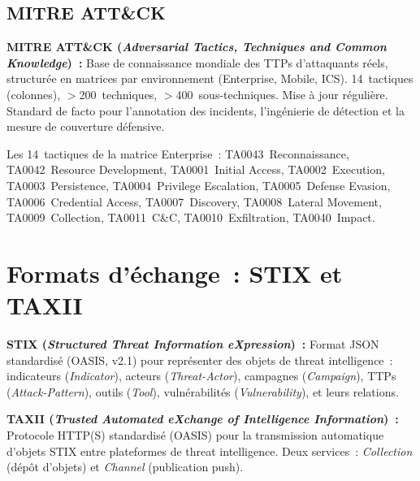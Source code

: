 \subsection{MITRE ATT\&CK}

\begin{boxdef}
\textbf{MITRE ATT\&CK (\textit{Adversarial Tactics, Techniques and Common
Knowledge})~:} Base de connaissance mondiale des TTPs d'attaquants réels,
structurée en matrices par environnement (Enterprise, Mobile, ICS).
14~tactiques (colonnes), $>$200~techniques, $>$400~sous-techniques.
Mise à jour régulière. Standard de facto pour l'annotation des incidents,
l'ingénierie de détection et la mesure de couverture défensive.
\end{boxdef}

Les 14~tactiques de la matrice Enterprise~:
TA0043~Reconnaissance, TA0042~Resource Development,
TA0001~Initial Access, TA0002~Execution, TA0003~Persistence,
TA0004~Privilege Escalation, TA0005~Defense Evasion,
TA0006~Credential Access, TA0007~Discovery, TA0008~Lateral Movement,
TA0009~Collection, TA0011~C\&C, TA0010~Exfiltration,
TA0040~Impact.

\section{Formats d'échange~: STIX et TAXII}
\label{sec:stix-taxii}

\begin{boxdef}
\textbf{STIX (\textit{Structured Threat Information eXpression})~:}
Format JSON standardisé (OASIS, v2.1) pour représenter des objets
de threat intelligence~: indicateurs (\textit{Indicator}),
acteurs (\textit{Threat-Actor}), campagnes (\textit{Campaign}),
TTPs (\textit{Attack-Pattern}), outils (\textit{Tool}),
vulnérabilités (\textit{Vulnerability}), et leurs relations.
\end{boxdef}

\begin{boxdef}
\textbf{TAXII (\textit{Trusted Automated eXchange of Intelligence
Information})~:} Protocole HTTP(S) standardisé (OASIS) pour la
transmission automatique d'objets STIX entre plateformes de threat
intelligence. Deux services~: \textit{Collection} (dépôt d'objets)
et \textit{Channel} (publication push).
\end{boxdef}

